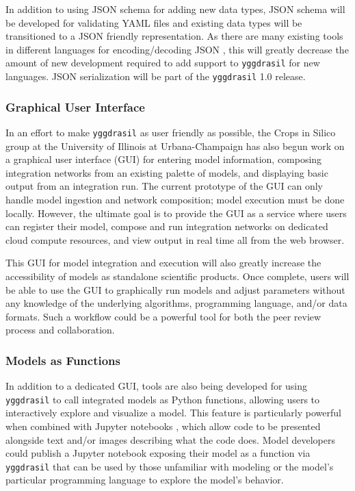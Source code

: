 \documentclass[journal]{IEEEtran}
\newcommand{\todo}[1]{{\color{red}{#1}}}
\newcommand{\pkg}{{\tt yggdrasil}{}}
\begin{document}
In addition to using JSON schema for adding new data types, JSON schema will be developed for validating YAML files and existing data types will be transitioned to a JSON friendly representation. As there are many existing tools in different languages for encoding/decoding JSON \citep[e.g. FSON, jsonlite,][]{Levin2019,Ooms2014}, this will greatly decrease the amount of new development required to add support to {\pkg} for new languages.
%
JSON serialization will be part of the {\pkg} 1.0 release.

\subsubsection{Graphical User Interface}\label{SS:gui}
%
In an effort to make {\pkg} as user friendly as possible, the Crops in Silico group at the University of Illinois at Urbana-Champaign has also begun work on a graphical user interface (GUI) for entering model information, composing integration networks from an existing palette of models, and displaying basic output from an integration run. The current prototype of the GUI can only handle model ingestion and network composition; model execution must be done locally. However, the ultimate goal is to provide the GUI as a service where users can register their model, compose and run integration networks on dedicated cloud compute resources, and view output in real time all from the web browser. 

This GUI for model integration and execution will also greatly increase the accessibility of models as standalone scientific products. Once complete, users will be able to use the GUI to graphically run models and adjust parameters without any knowledge of the underlying algorithms, programming language, and/or data formats. Such a workflow could be a powerful tool for both the peer review process and collaboration.


\subsubsection{Models as Functions}\label{SS:function}
%
In addition to a dedicated GUI, tools are also being developed for using {\pkg} to call integrated models as Python functions, allowing users to interactively explore and visualize a model. This feature is particularly powerful when combined with Jupyter notebooks \citep{Kluyver2016}, which allow code to be presented alongside text and/or images describing what the code does. Model developers could publish a Jupyter notebook exposing their model as a function via {\pkg} that can be used by those unfamiliar with modeling or the model's particular programming language to explore the model's behavior. 
\end{document}
